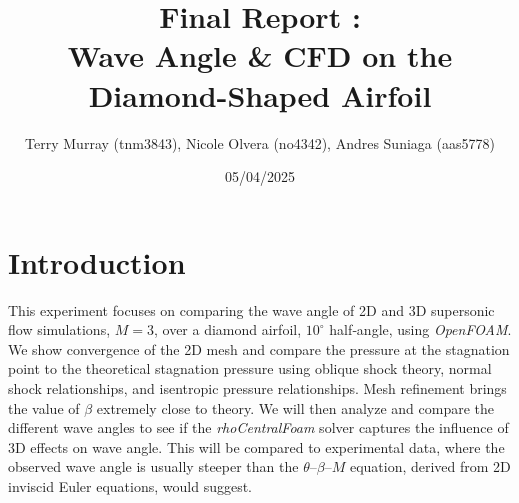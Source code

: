 \documentclass[11pt]{article}
\title{\bf Final Report : \\[2mm] Wave Angle \& CFD on the Diamond-Shaped Airfoil}
\author{Terry Murray (tnm3843), Nicole Olvera (no4342), Andres Suniaga (aas5778)}
\date{05/04/2025}
\newcommand{\bR}{\mathbb{R}}
\begin{document}
\maketitle

\noindent\makebox[\textwidth]{\rule{\textwidth}{0.2pt}}
\tableofcontents
\noindent\makebox[\textwidth]{\rule{\textwidth}{0.2pt}}
\pagebreak

\section{Introduction}
This experiment focuses on comparing the wave angle of 2D and 3D supersonic flow simulations, $M = 3$, over a diamond airfoil, $10^{\circ}$ half‑angle, using \textit{OpenFOAM}. We show convergence of the 2D mesh and compare the pressure at the stagnation point to the theoretical stagnation pressure using oblique shock theory, normal shock relationships, and isentropic pressure relationships. Mesh refinement brings the value of $\beta$ extremely close to theory. We will then analyze and compare the different wave angles to see if the \textit{rhoCentralFoam} solver captures the influence of 3D effects on wave angle. This will be compared to experimental data, where the observed wave angle is usually steeper than the $\theta$–$\beta$–$M$ equation, derived from 2D inviscid Euler equations, would suggest. 


\end{document}
